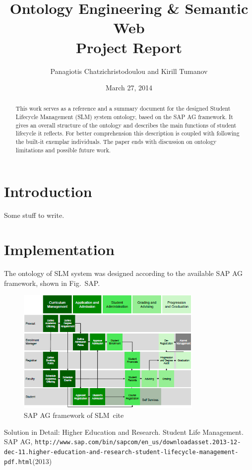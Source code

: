 \documentclass[html]{article}    %
\title{Ontology Engineering \& Semantic Web \\ Project Report}  %
\author{Panagiotis Chatzichristodoulou and Kirill Tumanov}    %
\date{March 27, 2014}   %
\begin{document}
%
\maketitle                 %
%
\begin{abstract}
%
This work serves as a reference and a summary document for the designed Student Lifecycle Management (SLM) system ontology, based on the SAP AG framework. It gives an overall structure of the ontology and describes the main functions of student lifecycle it reflects. For better comprehension this description is coupled with following the built-it exemplar individuals. The paper ends with discussion on ontology limitations and possible future work.
%
\end{abstract}
%
% 
\section{Introduction}
%
Some stuff to write.
% 
\section{Implementation}
%
The ontology of SLM system was designed according to the available SAP AG framework, shown in Fig.~{SAP}.
\begin{figure}[htbp]
  \centering
    \includegraphics[width=0.8\textwidth]{Materials/Figures/1.png}
    \caption{SAP AG framework of SLM~cite{}}
  \label{SAP}
\end{figure}

%
%
\begin{thebibliography}{99}
%
Solution in Detail: Higher Education and Research. Student Life Management.
SAP AG, \texttt{http://www.sap.com/bin/sapcom/en\_us/downloadasset.2013-12-dec-11.higher-education-and-research-student-lifecycle-\newline management-pdf.html}(2013)

\end{thebibliography}
\end{document}
